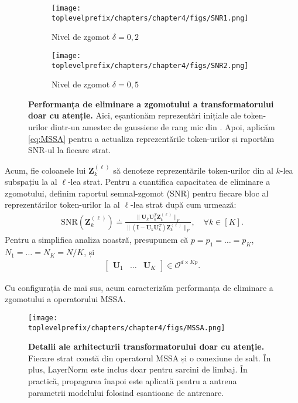 \documentclass[../../book-main_ro.tex]{subfiles}
\begin{document}
\begin{figure}[t]
    \begin{subfigure}[t]{0.45\textwidth}
        \centering
        \texttt{[image: \\toplevelprefix/chapters/chapter4/figs/SNR1.png]}
        \caption{Nivel de zgomot $\delta = 0,2$}
    \end{subfigure}
    \hfill
    \begin{subfigure}[t]{0.45\textwidth}
        \centering
        \texttt{[image: \\toplevelprefix/chapters/chapter4/figs/SNR2.png]}
        \caption{Nivel de zgomot $\delta = 0,5$}
    \end{subfigure}
    \caption{{\bf Performanța de eliminare a zgomotului a transformatorului doar cu atenție.} Aici, eșantionăm reprezentări inițiale ale token-urilor dintr-un amestec de gaussiene de rang mic din . Apoi, aplicăm \eqref{eq:MSSA} pentru a actualiza reprezentările token-urilor și raportăm SNR-ul la fiecare strat.} \label{fig:MSSA}
\end{figure}


Acum, fie coloanele lui $\bm Z_k^{(\ell)}$ să denoteze reprezentările token-urilor din al $k$-lea subspațiu la al $\ell$-lea strat. Pentru a cuantifica capacitatea de eliminare a zgomotului, definim raportul semnal-zgomot (SNR) pentru fiecare bloc al reprezentărilor token-urilor la al $\ell$-lea strat după cum urmează:
\begin{align}\label{def:SNR}
\mathrm{SNR}(\bm Z_k^{(\ell)}) \doteq  \frac{\|\bm U_k\bm U_k^T\bm Z_k^{(\ell)} \|_F}{\|(\bm I - \bm U_k\bm U_k^T)\bm Z_k^{(\ell)} \|_F},\quad \forall k \in [K].
\end{align}
Pentru a simplifica analiza noastră, presupunem că $p=p_1=\dots=p_K$, $N_1=\dots=N_K=N/K$, și
\begin{align}\label{eq:orth}
\begin{bmatrix}
\bm U_1 & \dots & \bm U_K
\end{bmatrix} \in \mathcal{O}^{d\times Kp}.
\end{align}

Cu configurația de mai sus, acum caracterizăm performanța de eliminare a zgomotului a operatorului MSSA.

\begin{figure*}[t]
\begin{center}
        \texttt{[image: \\toplevelprefix/chapters/chapter4/figs/MSSA.png]}
    \caption{\textbf{Detalii ale arhitecturii transformatorului doar cu atenție.} Fiecare strat constă din operatorul MSSA și o conexiune de salt. În plus, LayerNorm este inclus doar pentru sarcini de limbaj. În practică, propagarea înapoi este aplicată pentru a antrena parametrii modelului folosind eșantioane de antrenare. %
    }\label{fig:transformer}
\end{center}
\end{figure*}
\end{document}
